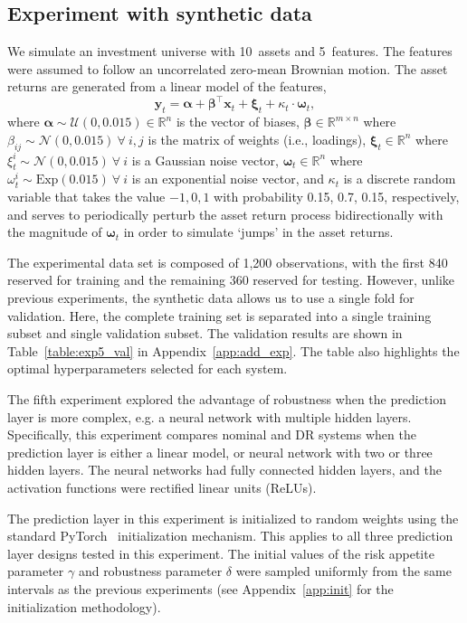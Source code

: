 \documentclass[10pt, twocolumn]{article}
\theoremstyle{plain}
\theoremstyle{definition}
\begin{document}
\subsection{Experiment with synthetic data}\label{sec:exp_synt}

We simulate an investment universe with 10~assets and 5~features. The features 
were assumed to follow an uncorrelated zero-mean Brownian motion. The asset returns 
are generated from a linear model of the features,
\[
    \bm{y}_t = \bm{\alpha} + \bm{\beta}^\top \bm{x}_t + \bm{\xi}_t + \kappa_t \cdot \bm{\omega}_t,
\]
where \(\bm{\alpha}\sim\mathcal{U}(0, 0.015)\in\mathbb{R}^n\) is the vector of biases,
\(\bm{\beta}\in\mathbb{R}^{m\times n}\) where \(\beta_{ij}\sim\mathcal{N}(0, 0.015)\ 
\forall\ i,j\) is the matrix of weights (i.e., loadings), \(\bm{\xi}_t\in\mathbb{R}^n\) 
where \(\xi_t^i\sim\mathcal{N}(0,0.015)\ \forall\ i\) is a Gaussian noise vector, 
\(\bm{\omega}_t\in\mathbb{R}^n\) where \(\omega_t^i\sim\mathrm{Exp}(0.015)\ \forall\ i\) 
is an exponential noise vector, and \(\kappa_t\) is a discrete random variable that 
takes the value \(-1,0,1\) with probability 0.15, 0.7, 0.15, respectively, and serves 
to periodically perturb the asset return process bidirectionally with the magnitude of 
\(\bm{\omega}_t\) in order to simulate `jumps' in the asset returns.

The experimental data set is 
composed of 1,200 observations, with the first 840 reserved for training and 
the remaining 360 reserved for testing. However, unlike previous experiments, 
the synthetic data allows us to use a single fold for validation. Here, the 
complete training set is separated into a single training subset and single 
validation subset. The validation results are shown in Table~\ref{table:exp5_val} 
in Appendix~\ref{app:add_exp}. The table also highlights the optimal 
hyperparameters selected for each system. 

The fifth experiment explored the advantage of robustness when the prediction 
layer is more complex, e.g. a neural network with multiple hidden layers. Specifically, 
this experiment compares nominal and DR systems when the prediction layer is either 
a linear model, or neural network with two or three hidden layers. The neural networks 
had fully connected hidden layers, and the activation functions were rectified linear 
units (ReLUs).

The prediction layer in this experiment is initialized to random weights using the 
standard PyTorch~\citep{paszke2019pytorch} initialization mechanism. This applies 
to all three prediction layer designs tested in this experiment. The initial values 
of the risk appetite parameter \(\gamma\) and robustness parameter \(\delta\) were 
sampled uniformly from the same intervals as the previous experiments (see 
Appendix~\ref{app:init} for the initialization methodology).
\end{document}
